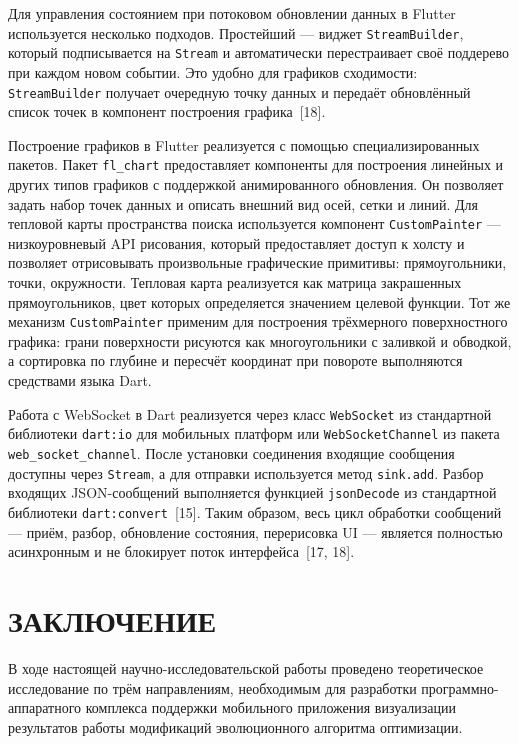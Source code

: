 \documentclass[14pt, russian]{scrartcl}
\newcommand{\anonsection}[1]{\cleardoublepage
\phantomsection
\addcontentsline{toc}{section}{\protect\numberline{}#1}
\section*{#1}\vspace*{2.5ex}
}
\begin{document}
Для управления состоянием при потоковом обновлении данных в Flutter
используется несколько подходов. Простейший --- виджет
\texttt{StreamBuilder}, который подписывается на \texttt{Stream} и
автоматически перестраивает своё поддерево при каждом новом событии.
Это удобно для графиков сходимости: \texttt{StreamBuilder} получает
очередную точку данных и передаёт обновлённый список точек в компонент
построения графика~[18].

Построение графиков в Flutter реализуется с помощью специализированных
пакетов. Пакет \texttt{fl\_chart} предоставляет компоненты для построения
линейных и других типов графиков с поддержкой анимированного обновления.
Он позволяет задать набор точек данных и описать внешний вид осей,
сетки и линий. Для тепловой карты пространства поиска используется
компонент \texttt{CustomPainter} --- низкоуровневый API рисования,
который предоставляет доступ к холсту и позволяет отрисовывать
произвольные графические примитивы: прямоугольники, точки, окружности.
Тепловая карта реализуется как матрица закрашенных прямоугольников,
цвет которых определяется значением целевой функции. Тот же механизм
\texttt{CustomPainter} применим для построения трёхмерного поверхностного
графика: грани поверхности рисуются как многоугольники
с заливкой и обводкой, а сортировка по глубине и пересчёт координат
при повороте выполняются средствами языка Dart.

Работа с WebSocket в Dart реализуется через класс \texttt{WebSocket}
из стандартной библиотеки \texttt{dart:io} для мобильных платформ
или \texttt{WebSocketChannel} из пакета \texttt{web\_socket\_channel}.
После установки соединения входящие сообщения доступны через
\texttt{Stream}, а для отправки используется метод \texttt{sink.add}.
Разбор входящих JSON-сообщений выполняется функцией
\texttt{jsonDecode} из стандартной библиотеки \texttt{dart:convert}~[15].
Таким образом, весь цикл обработки сообщений --- приём, разбор,
обновление состояния, перерисовка UI --- является полностью
асинхронным и не блокирует поток интерфейса~[17, 18].


\anonsection{ЗАКЛЮЧЕНИЕ}

В ходе настоящей научно-исследовательской работы проведено теоретическое
исследование по трём направлениям, необходимым для разработки
программно-аппаратного комплекса поддержки мобильного приложения
визуализации результатов работы модификаций эволюционного алгоритма
оптимизации.
\end{document}
